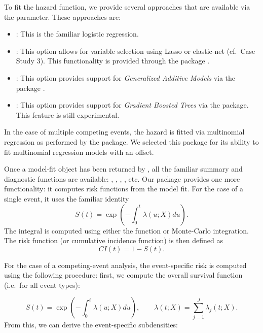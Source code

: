\documentclass[
]{jss}
\providecommand{\tightlist}{%
  \setlength{\itemsep}{0pt}\setlength{\parskip}{0pt}}
\begin{document}
To fit the hazard function, we provide several approaches that are
available via the  parameter. These approaches are:

\begin{itemize}
\tightlist
\item
  : This is the familiar logistic regression.
\item
  : This option allows for variable selection using Lasso
  or elastic-net (cf.~Case Study 3). This functionality is provided
  through the  package \citep{friedman2010jss}.
\item
  : This option provides support for \emph{Generalized
  Additive Models} via the  package
  \citep{hastie1987generalized}.
\item
  : This option provides support for \emph{Gradient Boosted
  Trees} via the  package. This feature is still experimental.
\end{itemize}

In the case of multiple competing events, the hazard is fitted via
multinomial regression as performed by the  package. We
selected this package for its ability to fit multinomial regression
models with an offset.

Once a model-fit object has been returned by , all
the familiar summary and diagnostic functions are available:
, , , , etc. Our
package provides one more functionality: it computes risk functions from
the model fit. For the case of a single event, it uses the familiar
identity \begin{equation}\label{eqn:surv}
S(t) = \exp\left(-\int_0^t \lambda(u;X) du\right).
\end{equation} The integral is computed using either the
 function or Monte-Carlo integration. The risk
function (or cumulative incidence function) is then defined as
\begin{equation}\label{eqn:CI}
CI(t) = 1 - S(t).
\end{equation}

For the case of a competing-event analysis, the event-specific risk is
computed using the following procedure: first, we compute the overall
survival function (i.e.~for all event types):

\[ S(t) = \exp\left(-\int_0^t \lambda(u;X) du\right),\qquad \lambda(t;X) = \sum_{j=1}^J \lambda_j(t;X).\]
From this, we can derive the event-specific subdensities:
\end{document}
